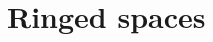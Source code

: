 \documentclass[../../../main]{subfiles}
\begin{document}
\chapter{Ringed spaces}






\end{document}
